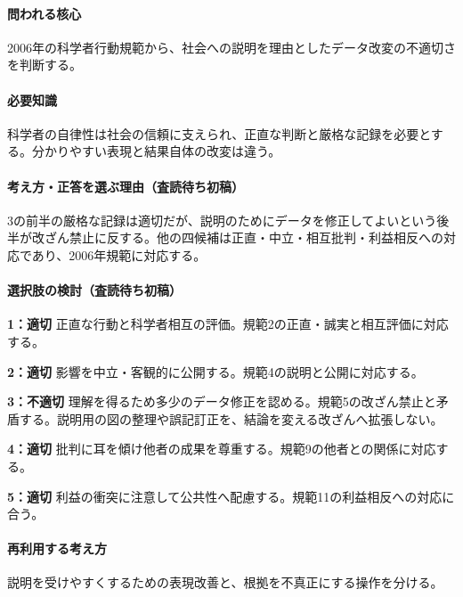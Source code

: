 \paragraph{問われる核心} 2006年の科学者行動規範から、社会への説明を理由としたデータ改変の不適切さを判断する。

\paragraph{必要知識} 科学者の自律性は社会の信頼に支えられ、正直な判断と厳格な記録を必要とする。分かりやすい表現と結果自体の改変は違う。

\paragraph{考え方・正答を選ぶ理由（査読待ち初稿）} 3の前半の厳格な記録は適切だが、説明のためにデータを修正してよいという後半が改ざん禁止に反する。他の四候補は正直・中立・相互批判・利益相反への対応であり、2006年規範に対応する。

\paragraph{選択肢の検討（査読待ち初稿）}\mbox{}\par

\noindent\textbf{1：適切} 正直な行動と科学者相互の評価。規範2の正直・誠実と相互評価に対応する。\par

\noindent\textbf{2：適切} 影響を中立・客観的に公開する。規範4の説明と公開に対応する。\par

\noindent\textbf{3：不適切} 理解を得るため多少のデータ修正を認める。規範5の改ざん禁止と矛盾する。説明用の図の整理や誤記訂正を、結論を変える改ざんへ拡張しない。\par

\noindent\textbf{4：適切} 批判に耳を傾け他者の成果を尊重する。規範9の他者との関係に対応する。\par

\noindent\textbf{5：適切} 利益の衝突に注意して公共性へ配慮する。規範11の利益相反への対応に合う。\par

\paragraph{再利用する考え方} 説明を受けやすくするための表現改善と、根拠を不真正にする操作を分ける。

